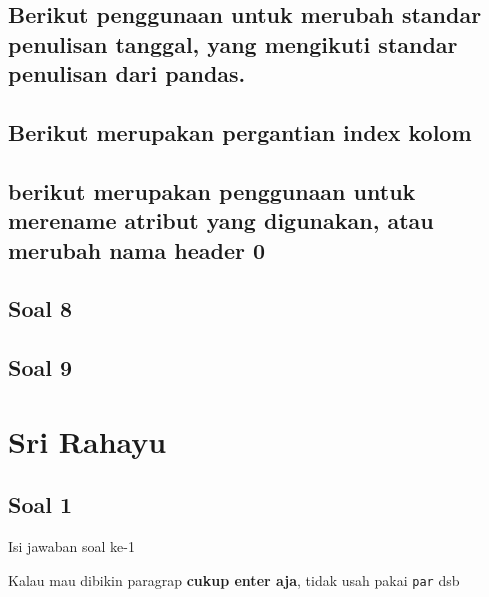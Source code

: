 \subsection{Berikut penggunaan untuk merubah standar penulisan tanggal, yang mengikuti standar penulisan dari pandas.}


\subsection{Berikut merupakan pergantian index kolom}


\subsection{berikut merupakan penggunaan untuk merename atribut yang digunakan, atau merubah nama header 0}


\subsection{Soal 8}


\subsection{Soal 9}



\section{Sri Rahayu}
\subsection{Soal 1}
Isi jawaban soal ke-1

Kalau mau dibikin paragrap \textbf{cukup enter aja}, tidak usah pakai \verb|par| dsb



